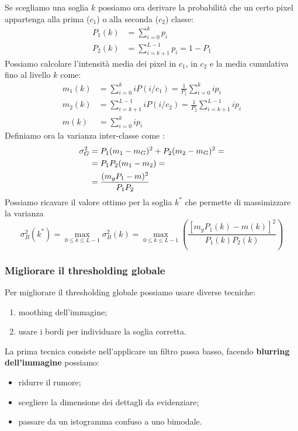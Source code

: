 Se scegliamo una soglia $k$ possiamo ora derivare la probabilità che un certo pixel appartenga alla prima ($c_1$) o alla seconda ($c_2$) classe:
\begin{align}
	P_1(k) & = \sum_{i = 0}^{k} p_i\\
	P_2(k) & = \sum_{i = k+1}^{L-1} p_i = 1-P_1
\end{align}
Possiamo calcolare l'intensità media dei pixel in $c_1$, in $c_2$ e la media cumulativa fino al livello $k$ come:
\begin{align}
	m_1(k) & = \sum_{i = 0}^{k} iP(i/c_1) = \frac{1}{P_1} \sum_{i = 0}^{k}ip_i\\
	m_2(k) & = \sum_{i = k+1}^{L-1} iP(i/c_2) = \frac{1}{P_2} \sum_{i = k+1}^{L-1}ip_i\\
	m(k) & = \sum_{i = 0}^{k} ip_i
\end{align}
Definiamo ora la varianza inter-classe come  :
\begin{align}
	\sigma^2_G & = P_1(m_1 - m_G)^2 + P_2(m_2 - m_G)^2= \notag \\
	& = P_1 P_2(m_1-m_2)= \notag \\
	& = \frac{(m_gP_1 - m)^2}{P_1 P_2}
\end{align}
Possiamo ricavare il valore ottimo per la soglia $k^*$ che permette di massimizzare la varianza
\begin{equation}
	\sigma^2_B(k^*) = \underset{0\leq k \leq L-1}{\max} \sigma^2_B(k) = \underset{0\leq k \leq L-1}{\max} \left( \frac{\left[m_gP_1(k) - m(k)\right]^2}{P_1(k)P_2(k)}\right)
\end{equation}

\subsubsection{Migliorare il thresholding globale}
Per migliorare il thresholding globale possiamo usare diverse tecniche:
\begin{enumerate}
	\item moothing dell'immagine;
	\item usare i bordi per individuare la soglia corretta.
\end{enumerate}
\newpage
La prima tecnica consiste nell'applicare un filtro passa basso, facendo \textbf{blurring dell'immagine} possiamo:
\begin{itemize}
	\item ridurre il rumore;
	\item scegliere la dimensione dei dettagli da evidenziare;
	\item passare da un istogramma confuso a uno bimodale.
\end{itemize}

